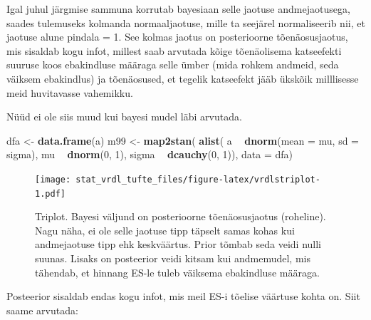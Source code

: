 \documentclass[]{book}
\newenvironment{Shaded}{\begin{snugshade}}{\end{snugshade}}
\newcommand{\KeywordTok}[1]{\textcolor[rgb]{0.13,0.29,0.53}{\textbf{#1}}}
\newcommand{\DataTypeTok}[1]{\textcolor[rgb]{0.13,0.29,0.53}{#1}}
\newcommand{\DecValTok}[1]{\textcolor[rgb]{0.00,0.00,0.81}{#1}}
\newcommand{\StringTok}[1]{\textcolor[rgb]{0.31,0.60,0.02}{#1}}
\newcommand{\OperatorTok}[1]{\textcolor[rgb]{0.81,0.36,0.00}{\textbf{#1}}}
\newcommand{\NormalTok}[1]{#1}
\begin{document}
Igal juhul järgmise sammuna korrutab bayesiaan selle jaotuse
andmejaotusega, saades tulemuseks kolmanda normaaljaotuse, mille ta
seejärel normaliseerib nii, et jaotuse alune pindala = 1. See kolmas
jaotus on posterioorne tõenäosusjaotus, mis sisaldab kogu infot, millest
saab arvutada kõige tõenäolisema katseefekti suuruse koos ebakindluse
määraga selle ümber (mida rohkem andmeid, seda väiksem ebakindlus) ja
tõenäosused, et tegelik katseefekt jääb ükskõik milllisesse meid
huvitavasse vahemikku.

Nüüd ei ole siis muud kui bayesi mudel läbi arvutada.

\begin{Shaded}
\begin{Highlighting}[]
\NormalTok{dfa <-}\StringTok{ }\KeywordTok{data.frame}\NormalTok{(a)}
\NormalTok{m99 <-}\StringTok{ }\KeywordTok{map2stan}\NormalTok{(}
  \KeywordTok{alist}\NormalTok{(}
\NormalTok{    a }\OperatorTok{~}\StringTok{ }\KeywordTok{dnorm}\NormalTok{(}\DataTypeTok{mean =}\NormalTok{ mu, }\DataTypeTok{sd =}\NormalTok{ sigma),}
\NormalTok{    mu  }\OperatorTok{~}\StringTok{ }\KeywordTok{dnorm}\NormalTok{(}\DecValTok{0}\NormalTok{, }\DecValTok{1}\NormalTok{), }
\NormalTok{    sigma }\OperatorTok{~}\StringTok{ }\KeywordTok{dcauchy}\NormalTok{(}\DecValTok{0}\NormalTok{, }\DecValTok{1}\NormalTok{)), }
  \DataTypeTok{data =}\NormalTok{ dfa)}
\end{Highlighting}
\end{Shaded}

\begin{figure}
\centering
\texttt{[image: stat\_vrdl\_tufte\_files/figure-latex/vrdlstriplot-1.pdf]}
\caption{\label{fig:vrdlstriplot}Triplot. Bayesi väljund on posterioorne
tõenäosusjaotus (roheline). Nagu näha, ei ole selle jaotuse tipp täpselt
samas kohas kui andmejaotuse tipp ehk keskväärtus. Prior tõmbab seda
veidi nulli suunas. Lisaks on posteerior veidi kitsam kui andmemudel,
mis tähendab, et hinnang ES-le tuleb väiksema ebakindluse määraga.}
\end{figure}

Posteerior sisaldab endas kogu infot, mis meil ES-i tõelise väärtuse
kohta on. Siit saame arvutada:
\end{document}
